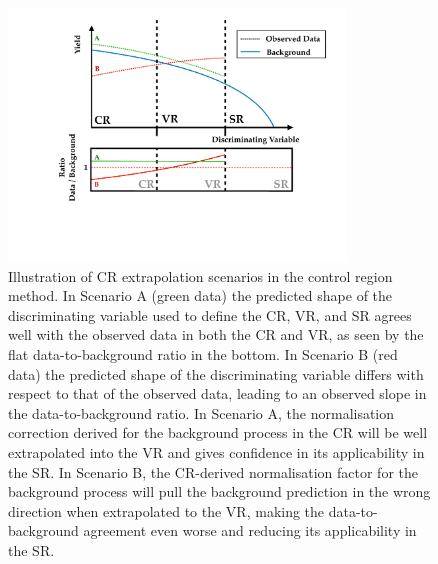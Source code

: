 \begin{figure}[!htb]
    \begin{center}
        \includegraphics[width=0.8\textwidth]{figures/common_ana/crvr_extrap_shape}
        \caption{
            Illustration of CR extrapolation scenarios in the control region method.
            In Scenario A (green data) the predicted shape of the discriminating variable
            used to define the CR, VR, and SR agrees well with the observed data
            in both the CR and VR, as seen by the flat data-to-background ratio in the bottom.
            In Scenario B (red data) the predicted shape of the discriminating variable
            differs with respect to that of the observed data, leading to an observed
            slope in the data-to-background ratio.
            In Scenario A, the normalisation correction derived for the background process
            in the CR will be well extrapolated into the VR and gives confidence in its applicability
            in the SR.
            In Scenario B, the CR-derived normalisation factor for the background process
            will pull the background prediction in the wrong direction when extrapolated
            to the VR, making the data-to-background agreement even worse and reducing
            its applicability in the SR.
        }
        \label{fig:crvr_extrap_shape}
    \end{center}
\end{figure}

\FloatBarrier
